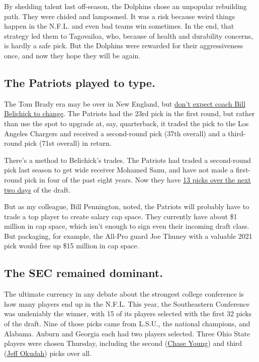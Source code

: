 By shedding talent last off-season, the Dolphins chose an unpopular
rebuilding path. They were chided and lampooned. It was a risk because
weird things happen in the N.F.L. and even bad teams win sometimes. In
the end, that strategy led them to Tagovailoa, who, because of health
and durability concerns, is hardly a safe pick. But the Dolphins were
rewarded for their aggressiveness once, and now they hope they will be
again.

\hypertarget{the-patriots-played-to-type}{%
\subsection{The Patriots played to
type.}\label{the-patriots-played-to-type}}

The Tom Brady era may be over in New England, but
\href{https://www.nytimes3xbfgragh.onion/2020/04/22/sports/football/patriots-nfl-draft-bill-belichick.html}{don't
expect coach Bill Belichick to change}. The Patriots had the 23rd pick
in the first round, but rather than use the spot to upgrade at, say,
quarterback, it traded the pick to the Los Angeles Chargers and received
a second-round pick (37th overall) and a third-round pick (71st overall)
in return.

There's a method to Belichick's trades. The Patriots had traded a
second-round pick last season to get wide receiver Mohamed Sanu, and
have not made a first-round pick in four of the past eight years. Now
they have
\href{https://boston.cbslocal.com/2020/04/23/patriots-trade-out-of-first-round-get-second-and-third-round-picks-from-chargers/}{13
picks over the next two days} of the draft.

But as my colleague, Bill Pennington, noted, the Patriots will probably
have to trade a top player to create salary cap space. They currently
have about \$1 million in cap space, which isn't enough to sign even
their incoming draft class. But packaging, for example, the All-Pro
guard Joe Thuney with a valuable 2021 pick would free up \$15 million in
cap space.

\hypertarget{the-sec-remained-dominant}{%
\subsection{The SEC remained
dominant.}\label{the-sec-remained-dominant}}

The ultimate currency in any debate about the strongest college
conference is how many players end up in the N.F.L. This year, the
Southeastern Conference was undeniably the winner, with 15 of its
players selected with the first 32 picks of the draft. Nine of those
picks came from L.S.U., the national champions, and Alabama. Auburn and
Georgia each had two players selected. Three Ohio State players were
chosen Thursday, including the second
(\href{https://www.nytimes3xbfgragh.onion/article/chase-young.html}{Chase
Young}) and third
(\href{https://www.nytimes3xbfgragh.onion/article/jeff-okudah.html}{Jeff
Okudah}) picks over all.


